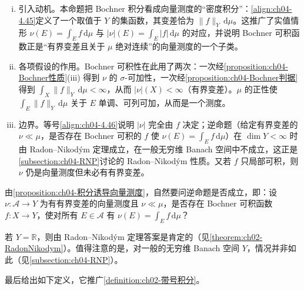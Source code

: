 \documentclass[../../main.tex]{subfiles}%
\begin{document}
\begin{remark}\label{remark:ch04-积分诱导向量测度动机}
\begin{enumerate}[(i)]
\item 引入动机。本命题把 Bochner 积分看成向量测度的“密度积分”：\eqref{align:ch04-4.45}定义了一个取值于 $Y$ 的集函数，其变差恰为 $\|f\|_Y\,\mathrm{d}\mu$。这推广了实值情形 $\nu(E)=\int_Ef\,\mathrm{d}\mu$ 与 $|\nu|(E)=\int_E|f|\,\mathrm{d}\mu$ 的对应，并说明 Bochner 可积函数正是“有界变差且关于 $\mu$ 绝对连续”的向量测度的一个子类。

\item 各项假设的作用。Bochner 可积性在此用了两次：一次经\cref{proposition:ch04-Bochner性质}(iii) 得到 $\nu$ 的 $\sigma$-可加性，一次经\cref{proposition:ch04-Bochner判据}得到 $\int_X\|f\|_Y\,\mathrm{d}\mu<\infty$，从而 $|\nu|(X)<\infty$（有界变差）。$\mu$ 的正性使 $\int_E\|f\|_Y\,\mathrm{d}\mu$ 关于 $E$ 单调、可列可加，从而是一个测度。

\item 边界。等号\eqref{align:ch04-4.46}说明 $|\nu|$ 完全由 $f$ 决定；逆命题（给定有界变差的 $\nu\ll\mu$，是否存在 Bochner 可积的 $f$ 使 $\nu(E)=\int_Ef\,\mathrm{d}\mu$）在 $\dim Y<\infty$ 时由 Radon--Nikodým 定理成立，在一般无穷维 Banach 空间中不成立，这正是\cref{subsection:ch04-RNP}讨论的 Radon--Nikodým 性质。又若 $f$ 只局部可积，则 $\nu$ 仍是向量测度但未必有有界变差。
\end{enumerate}
\end{remark}

\begin{remark}\label{remark:ch04-RN反例}
由\cref{proposition:ch04-积分诱导向量测度}，自然要问逆命题是否成立，即：设 $\nu:\mathcal{A}\to Y$ 为有有界变差的向量测度且 $\nu\ll\mu$，是否存在 Bochner 可积函数 $f:X\to Y$，使对所有 $E\in\mathcal{A}$ 有 $\nu(E)=\int_Ef\,\mathrm{d}\mu$？

若 $Y=\mathbb{R}$，则由 Radon--Nikodým 定理答案是肯定的（见\cref{theorem:ch02-RadonNikodym}）。值得注意的是，对一般的无穷维 Banach 空间 $Y$，情况并非如此（见\cref{subsection:ch04-RNP}）。
\end{remark}

最后给出如下定义，它推广\cref{definition:ch02-带号积分}。
\end{document}
